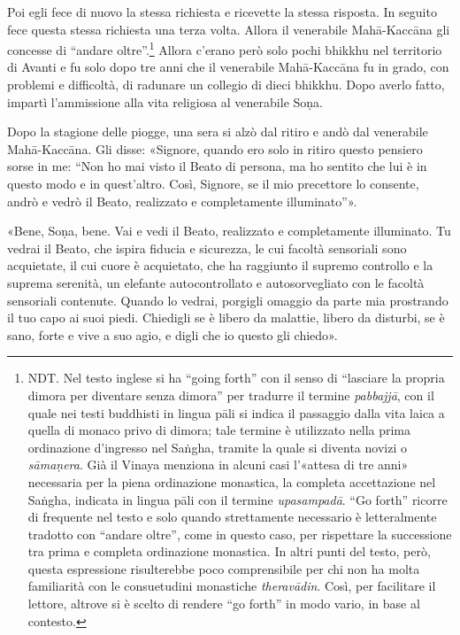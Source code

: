 Poi egli fece di nuovo la stessa richiesta e ricevette la stessa risposta. In
seguito fece questa stessa richiesta una terza volta. Allora il venerabile
Mahā-Kaccāna gli concesse di “andare oltre”.\footnote{NDT. Nel testo inglese si
  ha “going forth” con il senso di “lasciare la propria dimora per diventare
  senza dimora” per tradurre il termine \emph{pabbajjā}, con il quale nei testi
  buddhisti in lingua pāli si indica il passaggio dalla vita laica a quella di
  monaco privo di dimora; tale termine è utilizzato nella prima ordinazione
  d’ingresso nel Saṅgha, tramite la quale si diventa novizi o \emph{sāmaṇera}.
  Già il Vinaya menziona in alcuni casi l’«attesa di tre anni» necessaria per la
  piena ordinazione monastica, la completa accettazione nel Saṅgha, indicata in
  lingua pāli con il termine \emph{upasampadā}. “Go forth” ricorre di frequente
  nel testo e solo quando strettamente necessario è letteralmente tradotto con
  “andare oltre”, come in questo caso, per rispettare la successione tra prima e
  completa ordinazione monastica. In altri punti del testo, però, questa
  espressione risulterebbe poco comprensibile per chi non ha molta familiarità
  con le consuetudini monastiche \emph{theravādin}. Così, per facilitare il
  lettore, altrove si è scelto di rendere “go forth” in modo vario, in base al
  contesto.} Allora c’erano però solo pochi bhikkhu nel territorio di Avanti e
fu solo dopo tre anni che il venerabile Mahā-Kaccāna fu in grado, con problemi e
difficoltà, di radunare un collegio di dieci bhikkhu. Dopo averlo fatto, impartì
l’ammissione alla vita religiosa al venerabile Soṇa.

Dopo la stagione delle piogge, una sera si alzò dal ritiro e andò dal venerabile
Mahā-Kaccāna. Gli disse: «Signore, quando ero solo in ritiro questo pensiero
sorse in me: “Non ho mai visto il Beato di persona, ma ho sentito che lui è in
questo modo e in quest’altro. Così, Signore, se il mio precettore lo consente,
andrò e vedrò il Beato, realizzato e completamente illuminato”».

«Bene, Soṇa, bene. Vai e vedi il Beato, realizzato e completamente illuminato.
Tu vedrai il Beato, che ispira fiducia e sicurezza, le cui facoltà sensoriali
sono acquietate, il cui cuore è acquietato, che ha raggiunto il supremo
controllo e la suprema serenità, un elefante autocontrollato e autosorvegliato
con le facoltà sensoriali contenute. Quando lo vedrai, porgigli omaggio da parte
mia prostrando il tuo capo ai suoi piedi. Chiedigli se è libero da malattie,
libero da disturbi, se è sano, forte e vive a suo agio, e digli che io questo
gli chiedo».

